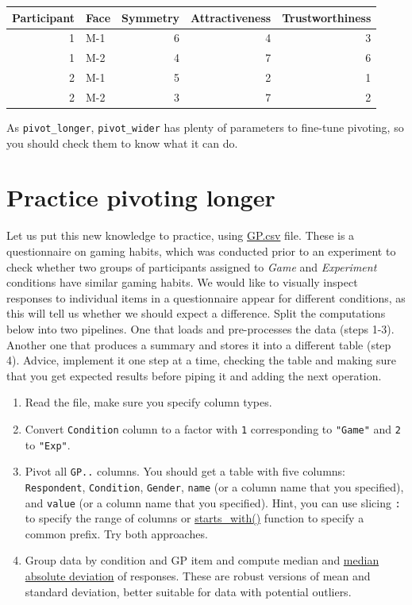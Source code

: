 \documentclass[
]{book}
\providecommand{\tightlist}{%
  \setlength{\itemsep}{0pt}\setlength{\parskip}{0pt}}
\begin{document}
\begin{tabular}{r|l|r|r|r}
\hline
Participant & Face & Symmetry & Attractiveness & Trustworthiness\\
\hline
1 & M-1 & 6 & 4 & 3\\
\hline
1 & M-2 & 4 & 7 & 6\\
\hline
2 & M-1 & 5 & 2 & 1\\
\hline
2 & M-2 & 3 & 7 & 2\\
\hline
\end{tabular}

As \texttt{pivot\_longer}, \texttt{pivot\_wider} has plenty of parameters to fine-tune pivoting, so you should check them to know what it can do.

\hypertarget{practice-pivoting-longer}{%
\section{Practice pivoting longer}\label{practice-pivoting-longer}}

Let us put this new knowledge to practice, using \href{data/GP.csv}{GP.csv} file. These is a questionnaire on gaming habits, which was conducted prior to an experiment to check whether two groups of participants assigned to \emph{Game} and \emph{Experiment} conditions have similar gaming habits. We would like to visually inspect responses to individual items in a questionnaire appear for different conditions, as this will tell us whether we should expect a difference. Split the computations below into two pipelines. One that loads and pre-processes the data (steps 1-3). Another one that produces a summary and stores it into a different table (step 4). Advice, implement it one step at a time, checking the table and making sure that you get expected results before piping it and adding the next operation.

\begin{enumerate}
\def\labelenumi{\arabic{enumi}.}
\tightlist
\item
  Read the file, make sure you specify column types.
\item
  Convert \texttt{Condition} column to a factor with \texttt{1} corresponding to \texttt{"Game"} and \texttt{2} to \texttt{"Exp"}.
\item
  Pivot all \texttt{GP..} columns. You should get a table with five columns: \texttt{Respondent}, \texttt{Condition}, \texttt{Gender}, \texttt{name} (or a column name that you specified), and \texttt{value} (or a column name that you specified). Hint, you can use slicing \texttt{:} to specify the range of columns or \href{https://tidyselect.r-lib.org/reference/starts_with.html}{starts\_with()} function to specify a common prefix. Try both approaches.
\item
  Group data by condition and GP item and compute median and \href{https://stat.ethz.ch/R-manual/R-devel/library/stats/html/mad.html}{median absolute deviation} of responses. These are robust versions of mean and standard deviation, better suitable for data with potential outliers.
\end{enumerate}
\end{document}
